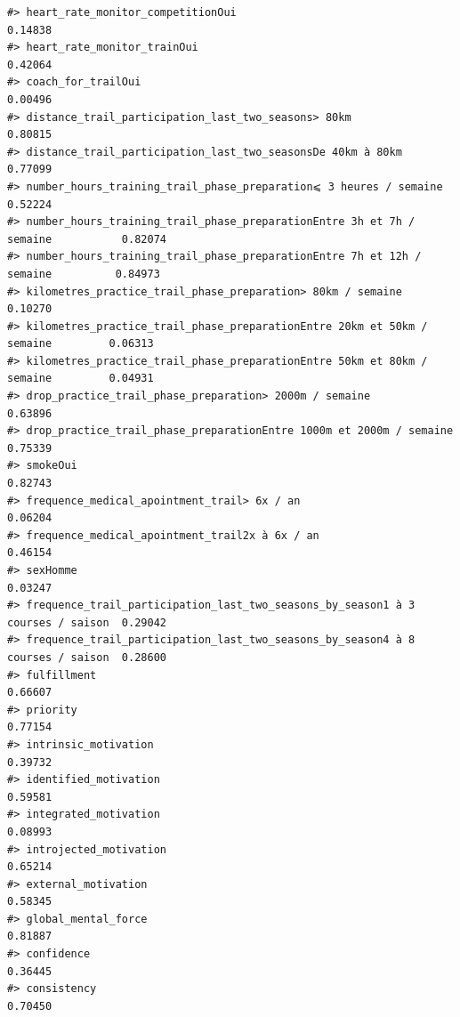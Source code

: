\documentclass[
]{article}
\begin{document}
\begin{verbatim}
#> heart_rate_monitor_competitionOui                                               0.14838
#> heart_rate_monitor_trainOui                                                     0.42064
#> coach_for_trailOui                                                              0.00496
#> distance_trail_participation_last_two_seasons> 80km                             0.80815
#> distance_trail_participation_last_two_seasonsDe 40km à 80km                     0.77099
#> number_hours_training_trail_phase_preparation⩽ 3 heures / semaine               0.52224
#> number_hours_training_trail_phase_preparationEntre 3h et 7h / semaine           0.82074
#> number_hours_training_trail_phase_preparationEntre 7h et 12h / semaine          0.84973
#> kilometres_practice_trail_phase_preparation> 80km / semaine                     0.10270
#> kilometres_practice_trail_phase_preparationEntre 20km et 50km / semaine         0.06313
#> kilometres_practice_trail_phase_preparationEntre 50km et 80km / semaine         0.04931
#> drop_practice_trail_phase_preparation> 2000m / semaine                          0.63896
#> drop_practice_trail_phase_preparationEntre 1000m et 2000m / semaine             0.75339
#> smokeOui                                                                        0.82743
#> frequence_medical_apointment_trail> 6x / an                                     0.06204
#> frequence_medical_apointment_trail2x à 6x / an                                  0.46154
#> sexHomme                                                                        0.03247
#> frequence_trail_participation_last_two_seasons_by_season1 à 3 courses / saison  0.29042
#> frequence_trail_participation_last_two_seasons_by_season4 à 8 courses / saison  0.28600
#> fulfillment                                                                     0.66607
#> priority                                                                        0.77154
#> intrinsic_motivation                                                            0.39732
#> identified_motivation                                                           0.59581
#> integrated_motivation                                                           0.08993
#> introjected_motivation                                                          0.65214
#> external_motivation                                                             0.58345
#> global_mental_force                                                             0.81887
#> confidence                                                                      0.36445
#> consistency                                                                     0.70450

\end{verbatim}
\end{document}
